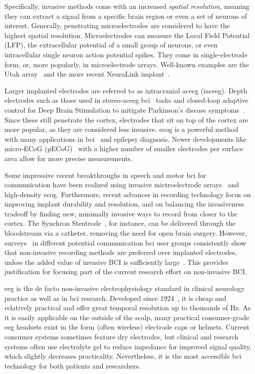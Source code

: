 Specifically, invasive methods come with an increased \emph{spatial resolution},
meaning they can extract a signal from a specific brain region or even a set of
neurons of interest.
Generally, penetrating microelectrodes are considered to have the highest
spatial resolution.
Microelectrodes can measure the Local Field Potential (LFP), the extracellular
potential of a small group of neurons, or even intracellular single neuron
action potential spikes.
They come in single-electrode form, or, more popularly, in microelectrode
arrays.
Well-known examples are the Utah array~\cite{Maynard1997} and the more recent
NeuraLink implant~\cite{Musk2019}.

Larger implanted electrodes are referred to as intracranial ac{eeg} (iac{eeg}).
Depth electrodes such as those used in stereo-ac{eeg} \ac{bci}~\cite{Wu2024} tasks
and closed-loop adaptive control for Deep Brain Stimulation to mitigate
Parkinson's disease symptoms~\cite{Arlotti2018}.
Since these still penetrate the cortex, electrodes that sit on top of the
cortex are more popular, as they are considered less invasive.
\Ac{ecog} is a powerful method
with many applications in \ac{bci}~\cite{Schalk2011} and epilepsy diagnosis.
Newer developments like micro-ECoG (µECoG)~\cite{Shokoueinejad2019} with a
higher number of smaller electrodes per surface area allow for more precise
measurements.

Some impressive recent breakthroughs in speech and motor \ac{bci} for communication
 have been realized using
invasive mictroelectrode arrays~\cite{Willett2021} and high-density
\Ac{ecog}\cite{Metzger2023}.
Furthermore, recent advances in recording technology focus on improving implant
durability and resolution, and on balancing the invasiveness
tradeoff by finding new, minimally invasive ways to record from closer to the cortex.
The Synchron Stentrode~\cite{Mitchell2023}, for instance, can be delivered
through the bloodstream via a catheter, removing the need for open brain
surgery.
However, surveys~\cite{Huggins2011, Huggins2015, Branco2021} in different
potential communication \ac{bci} user groups consistently show that non-invasive
recording methods are preferred over implanted electrodes, unless the added value of invasive BCI is
sufficiently large~\cite{Kageyama2020}.
This provides justification for focusing part of the current research effort on
non-invasive BCI.

\Ac{eeg} is the de facto non-invasive electrophysiology standard in clinical
neurology practice as well as in \ac{bci} research.
Developed since 1924~\cite{Berger1929}, it is cheap and relatively practical and
offer great temporal resolution up to thousands of Hz.
As it is easily applicable on the outside of the scalp, many practical
consumer-grade \ac{eeg} headsets exist in the form (often wireless) electrode
caps or helmets.
Current consumer systems sometimes feature dry electrodes, but clinical and
research systems often use electrolyte gel to reduce impedance for improved signal
quality, which slightly decreases practicality.
Nevertheless, it is the most accessible \ac{bci} technology for both patients
and researchers.

